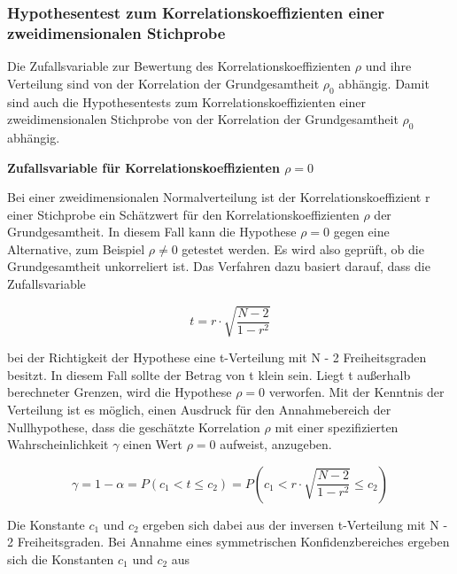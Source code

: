 \subsubsection{Hypothesentest zum Korrelationskoeffizienten einer zweidimensionalen Stichprobe}

\noindent Die Zufallsvariable zur Bewertung des Korrelationskoeffizienten $\rho$ und ihre Verteilung sind von der Korrelation der Grundgesamtheit $\rho_{0}$ abh\"{a}ngig. Damit sind auch die Hypothesentests zum Korrelationskoeffizienten einer zweidimensionalen Stichprobe von der Korrelation der Grundgesamtheit $\rho_{0}$ abh\"{a}ngig. 

\clearpage

{\selectfont
\noindent\textbf{Zufallsvariable f\"{u}r Korrelationskoeffizienten $\rho = 0$}}\smallskip

\noindent Bei einer zweidimensionalen Normalverteilung ist der Korrelationskoeffizient r einer Stichprobe ein Sch\"{a}tzwert f\"{u}r den Korrelationskoeffizienten $\rho$ der Grundgesamtheit. In diesem Fall kann die Hypothese $\rho = 0 $ gegen eine Alternative, zum Beispiel $\rho \neq 0$ getestet werden. Es wird also gepr\"{u}ft, ob die Grundgesamtheit unkorreliert ist. Das Verfahren dazu basiert darauf, dass die Zufallsvariable 

\begin{equation}\label{eq:tenfourtyeight}
t=r\cdot \sqrt{\dfrac{N-2}{1-r^{2}}} 
\end{equation}

\noindent bei der Richt\noindent igkeit der Hypothese eine t-Verteilung mit N - 2 Freiheitsgraden besitzt. In diesem Fall sollte der Betrag von t klein sein. Liegt t au{\ss}erhalb berechneter Grenzen, wird die Hypothese $\rho = 0$ verworfen. Mit der Kenntnis der Verteilung ist es m\"{o}glich, einen Ausdruck f\"{u}r den Annahmebereich der Nullhypothese, dass die gesch\"{a}tzte Korrelation $\rho$ mit einer spezifizierten Wahrscheinlichkeit $\gamma$ einen Wert $\rho = 0$ aufweist, anzugeben.

\begin{equation}\label{eq:tenfourtynine}
\gamma =1-\alpha =P\left(c_{1} <t\le c_{2} \right)=P(c_{1} <r\cdot \sqrt{\dfrac{N-2}{1-r^{2}}} \le c_{2})
\end{equation}

\noindent Die Konstante $c_{1}$ und $c_{2}$ ergeben sich dabei aus der inversen t-Verteilung mit N - 2 Freiheitsgraden. Bei Annahme eines symmetrischen Konfidenzbereiches ergeben sich die Konstanten $c_{1}$ und $c_{2}$ aus 

